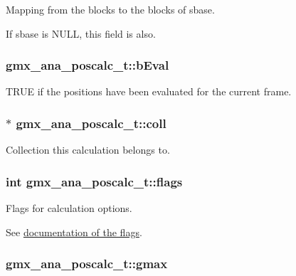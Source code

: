 \-Mapping from the blocks to the blocks of {\ttfamily sbase}. 

\-If {\ttfamily sbase} is \-N\-U\-L\-L, this field is also. \hypertarget{structgmx__ana__poscalc__t_a7c6bb76585fe8302b61fee5fbc043f01}{
\subsubsection[{b\-Eval}]{ {\bf gmx\-\_\-ana\-\_\-poscalc\-\_\-t\-::b\-Eval}}}\label{structgmx__ana__poscalc__t_a7c6bb76585fe8302b61fee5fbc043f01}
\-T\-R\-U\-E if the positions have been evaluated for the current frame. \hypertarget{structgmx__ana__poscalc__t_a73aee440ed9973613bbc1fb44a6630b6}{
\subsubsection[{coll}]{$\ast$ {\bf gmx\-\_\-ana\-\_\-poscalc\-\_\-t\-::coll}}}\label{structgmx__ana__poscalc__t_a73aee440ed9973613bbc1fb44a6630b6}
\-Collection this calculation belongs to. \hypertarget{structgmx__ana__poscalc__t_a2f28c7133614840ed0cc44ae8ef7413e}{
\subsubsection[{flags}]{\setlength{\rightskip}{0pt plus 5cm}int {\bf gmx\-\_\-ana\-\_\-poscalc\-\_\-t\-::flags}}}\label{structgmx__ana__poscalc__t_a2f28c7133614840ed0cc44ae8ef7413e}


\-Flags for calculation options. 

\-See \hyperlink{share_2template_2gromacs_2poscalc_8h_poscalc_flags}{documentation of the flags}. \hypertarget{structgmx__ana__poscalc__t_a861c9c269ede19d7a6ce5656a6486cae}{
\subsubsection[{gmax}]{ {\bf gmx\-\_\-ana\-\_\-poscalc\-\_\-t\-::gmax}}}\label{structgmx__ana__poscalc__t_a861c9c269ede19d7a6ce5656a6486cae}


